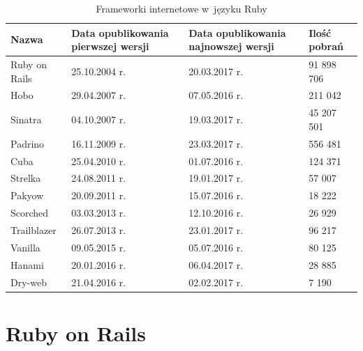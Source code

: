 \documentclass[printmode]{mgr}
\begin{document}
\begin{table}[H]
  \caption{ Frameworki internetowe w~języku Ruby \protect\footnotemark}
  \centering
  \begin{tabularx}{1\linewidth}{|X|X|X|X|} \hline
    Nazwa & Data opublikowania \newline pierwszej wersji & Data opublikowania \newline  najnowszej wersji & Ilość pobrań \\ \hline
    \rowcolor{lightgray}
    Ruby on Rails & 25.10.2004 r. & 20.03.2017 r. & 91 898 706 \\ \hline
    Hobo & 29.04.2007 r. & 07.05.2016 r. & 211 042 \\ \hline
    Sinatra & 04.10.2007 r. & 19.03.2017 r. & 45 207 501 \\ \hline
    Padrino & 16.11.2009 r. & 23.03.2017 r. & 556 481 \\ \hline
    Cuba & 25.04.2010 r. & 01.07.2016 r. & 124 371 \\ \Xhline{4\arrayrulewidth}
    Strelka & 24.08.2011 r. & 19.01.2017 r. & 57 007 \\ \hline
    Pakyow & 20.09.2011 r. & 15.07.2016 r. & 18 222 \\ \hline
    Scorched & 03.03.2013 r. & 12.10.2016 r. & 26 929 \\ \hline
    \rowcolor{lightgray}
    Trailblazer & 26.07.2013 r. & 23.01.2017 r. & 96 217 \\ \hline
    Vanilla & 09.05.2015 r. & 05.07.2016 r. & 80 125 \\ \Xhline{4\arrayrulewidth}
    \rowcolor{lightgray}
    Hanami & 20.01.2016 r. & 06.04.2017 r. & 28 885 \\ \hline
    Dry-web & 21.04.2016 r. & 02.02.2017 r. & 7 190 \\ \hline
  \end{tabularx}
\end{table}

\section{Ruby on Rails}
\end{document}
